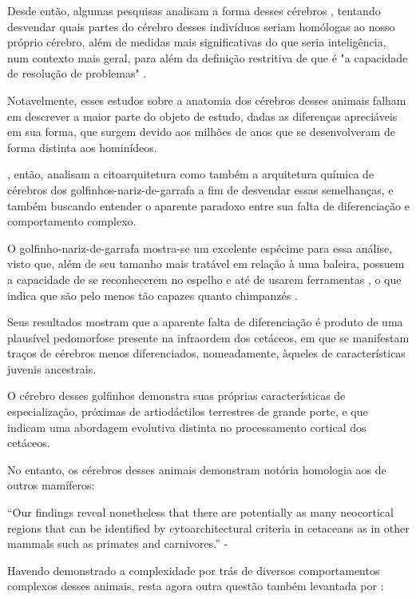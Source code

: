\documentclass[
    12pt,
    openright,
    twoside,
    a4paper,
    english,
    french,
    spanish,
    brazil
    ]{abntex2}
\begin{document}
Desde então, algumas pesquisas analisam a forma desses cérebros
\cite{gaskin1982ecology, aronson1988conservative}, tentando desvendar quais
partes do cérebro desses indivíduos seriam homólogas ao nosso próprio cérebro,
além de medidas mais significativas do que seria inteligência, num contexto
mais geral, para além da definição restritiva de que é "a capacidade de
resolução de problemas" \cite{pearce2013animal}.

Notavelmente, esses estudos sobre a anatomia dos cérebros desses animais
falham em descrever a maior parte do objeto de estudo, dadas as diferenças
apreciáveis em sua forma, que surgem devido aos milhões de anos que se
desenvolveram de forma distinta aos hominídeos.

, então, analisam a citoarquitetura como também a arquitetura
química de cérebros dos golfinhos-nariz-de-garrafa a fim de desvendar essas
semelhanças, e também buscando entender o aparente paradoxo entre sua falta de
diferenciação e comportamento complexo.

O golfinho-nariz-de-garrafa mostra-se um excelente espécime para essa análise,
visto que, além de seu tamanho mais tratável em relação à uma baleira, possuem
a capacidade de se reconhecerem no espelho \cite{reiss2001mirror} e até de
usarem ferramentas \cite{krutzen2005cultural}, o que indica que são pelo menos
tão capazes quanto chimpanzés \cite{herman2002exploring}.

Seus resultados mostram que a aparente falta de diferenciação é produto de uma
plausível pedomorfose presente na infraordem dos cetáceos, em que se manifestam
traços de cérebros menos diferenciados, nomeadamente, àqueles de
características juvenis ancestrais.

O cérebro desses golfinhos demonstra suas próprias características de
especialização, próximas de artiodáctilos terrestres de grande porte, e que
indicam uma abordagem evolutiva distinta no processamento cortical dos
cetáceos.

No entanto, os cérebros desses animais demonstram notória homologia aos de outros mamíferos:

\begin{displayquote}
``Our findings reveal nonetheless that there are potentially as many neocortical
    regions that can be identified by cytoarchitectural criteria in cetaceans
    as in other mammals such as primates and carnivores.'' - 
\end{displayquote}

Havendo demonstrado a complexidade por trás de diversos comportamentos
complexos desses animais, resta agora outra questão também levantada por
\cite{main}:
\end{document}
